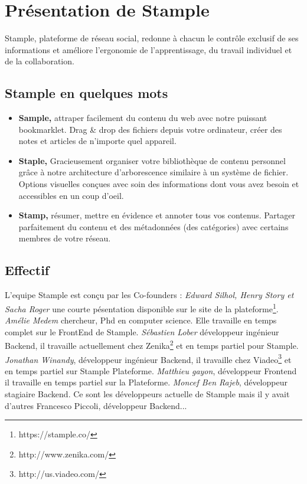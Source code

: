 \documentclass[12pt,oneside,a4paper]{article}
\begin{document}
\section{Présentation de Stample}
Stample, plateforme de réseau social, redonne à chacun le contrôle exclusif de ses informations et améliore l'ergonomie de l'apprentissage, du travail individuel et de la collaboration.
\subsection{Stample en quelques mots}
\begin{itemize}
\item \textbf{Sample,} attraper facilement du contenu du web avec notre puissant bookmarklet. Drag \& drop des fichiers depuis votre ordinateur, créer des notes et articles de n'importe quel appareil.
\item \textbf{Staple,} Gracieusement organiser votre bibliothèque de contenu personnel grâce à notre architecture d'arborescence similaire à un système de fichier.
Options visuelles conçues avec soin des informations dont vous avez besoin et accessibles en un coup d'oeil.
\item \textbf{Stamp,} résumer, mettre en évidence et annoter tous vos contenus.
Partager parfaitement du contenu et des métadonnées (des catégories) avec certains membres de votre réseau.
\end{itemize}
\subsection{Effectif}
L'equipe Stample est conçu par les Co-founders :
\textit{Edward Silhol, Henry Story et Sacha Roger} une courte pésentation disponible sur le site de la plateforme\footnote{https://stample.co/}.\newline
\textit{Amélie Medem} chercheur, Phd en computer science. Elle travaille en temps complet sur le FrontEnd de Stample.\newline
\textit{Sébastien Lober} développeur ingénieur Backend, il travaille actuellement chez Zenika\footnote{http://www.zenika.com/} et en temps partiel pour Stample.\newline
\textit{Jonathan Winandy}, développeur ingénieur Backend, il travaille chez Viadeo\footnote{http://us.viadeo.com/} et en temps partiel sur Stample Plateforme.\newline
\textit{Matthieu gayon}, développeur Frontend il travaille en temps partiel sur la Plateforme.\newline
\textit{Moncef Ben Rajeb}, développeur stagiaire Backend.\newline
Ce sont les développeurs actuelle de Stample mais il y avait d'autres Francesco Piccoli, développeur Backend...
\end{document}
